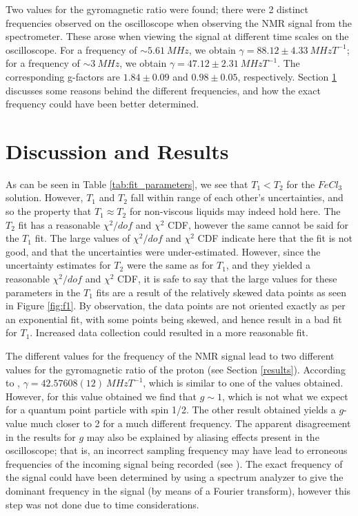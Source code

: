 \documentclass[a4paper, 12pt]{article}  %
\begin{document}
 Two values for the gyromagnetic ratio were found; there were 2 distinct frequencies observed on the oscilloscope when observing the NMR signal from the spectrometer. These arose when viewing the signal at different time scales on the oscilloscope. For a frequency of $\sim 5.61 \ MHz$, we obtain $\gamma = 88.12 \pm 4.33 \ MHzT^{-1}$; for a frequency of $\sim 3 \ MHz$, we obtain $\gamma = 47.12 \pm 2.31 \ MHzT^{-1}$. The corresponding g-factors are $1.84 \pm 0.09$ and $0.98 \pm 0.05$, respectively. Section \ref{Discussion} discusses some reasons behind the different frequencies, and how the exact frequency could have been better determined.
 
 
 


\section{Discussion and Results}\label{Discussion}
As can be seen in Table \ref{tab:fit_parameters}, we see that $T_1 < T_2$ for the $FeCl_3$ solution. However, $T_1$ and $T_2$ fall within range of each other's uncertainties, and so the property that $T_1 \approx T_2$ for non-viscous liquids may indeed hold here. The $T_2$ fit has a reasonable $\chi^2 / dof$ and $\chi^2$ CDF, however the same cannot be said for the $T_1$ fit. The large values of $\chi^2 / dof$ and $\chi^2$ CDF indicate here that the fit is not good, and that the uncertainties were under-estimated. However, since the uncertainty estimates for $T_2$ were the same as for $T_1$, and they yielded a reasonable $\chi^2 / dof$ and $\chi^2$ CDF, it is safe to say that the large values for these parameters in the $T_1$ fits are a result of the relatively skewed data points as seen in Figure \ref{fig:f1}. By observation, the data points are not oriented exactly as per an exponential fit, with some points being skewed, and hence result in a bad fit for $T_1$. Increased data collection could resulted in a more reasonable fit.
\newline

The different values for the frequency of the NMR signal lead to two different values for the gyromagnetic ratio of the proton (see Section \ref{results}). According to \cite{Gyromagnetic_ratio_NIST}, $\gamma =  42.57608(12) \ MHz T^{-1}$, which is similar to one of the values obtained. However, for this value obtained we find that $g \sim 1$, which is not what we expect for a quantum point particle with spin 1/2. The other result obtained yields a $g$-value much closer to 2 for a much different frequency. The apparent disagreement in the results for $g$ may also be explained by aliasing effects present in the oscilloscope; that is, an incorrect sampling frequency may have lead to erroneous frequencies of the incoming signal being recorded (see \cite{aliasing}). The exact frequency of the signal could have been determined by using a spectrum analyzer to give the dominant frequency in the signal (by means of a Fourier transform), however this step was not done due to time considerations. 
\newline
\end{document}
